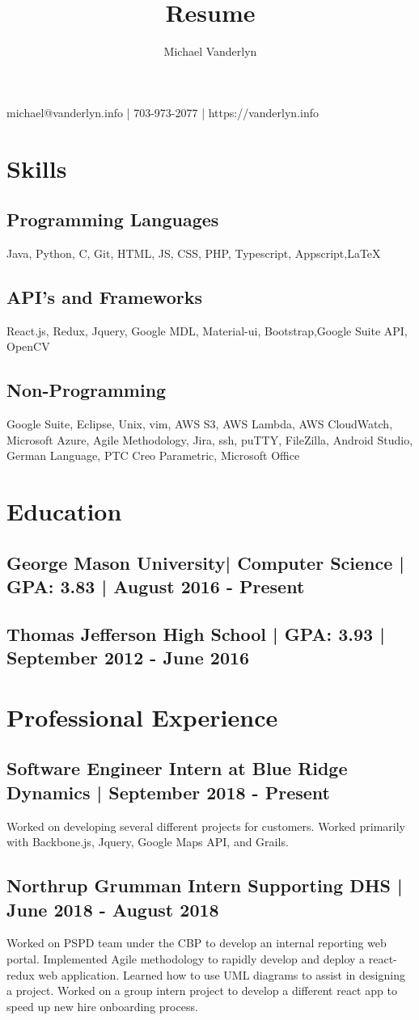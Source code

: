 \documentclass[12]{article}
\makeatletter
\renewcommand{\maketitle}{
\begin{center}
{\Huge\bfseries
\theauthor}

\vspace{.25em}
 
\vspace{.25em}

michael@vanderlyn.info | 703-973-2077 | https://vanderlyn.info
\end{center}
}
\makeatother
\begin{document}
\title{Resume}
\author{Michael Vanderlyn}
\maketitle
\section{Skills}
\subsection{Programming Languages}
Java, Python, C, Git,  HTML, JS, CSS, PHP, Typescript, Appscript,LaTeX
\subsection{API's and Frameworks}
React.js, Redux, Jquery, Google MDL, Material-ui, Bootstrap,Google  Suite API, OpenCV
\subsection{Non-Programming}
Google Suite, Eclipse, Unix, vim, AWS S3, AWS Lambda, AWS CloudWatch, Microsoft Azure, Agile Methodology, Jira, ssh, puTTY, FileZilla, Android Studio, German Language, PTC Creo Parametric, Microsoft Office
\section{Education}
\subsection{George Mason University| Computer Science | GPA: 3.83 | August 2016 - Present}
\subsection{Thomas Jefferson High School | GPA: 3.93 | September 2012 - June 2016}
\section{Professional Experience}
\subsection{Software Engineer Intern at Blue Ridge Dynamics | September 2018 - Present}
Worked on developing several different projects for customers. Worked primarily with Backbone.js, Jquery, Google Maps API, and Grails. 
\subsection{Northrup Grumman Intern Supporting DHS | June 2018 - August 2018}
Worked on PSPD team under the CBP to develop an internal reporting web portal. Implemented Agile methodology to rapidly develop and deploy a react-redux web application. Learned how to use UML diagrams to assist in designing a project. Worked on a group intern project to develop a different react app to speed up new hire onboarding process.
\end{document}
